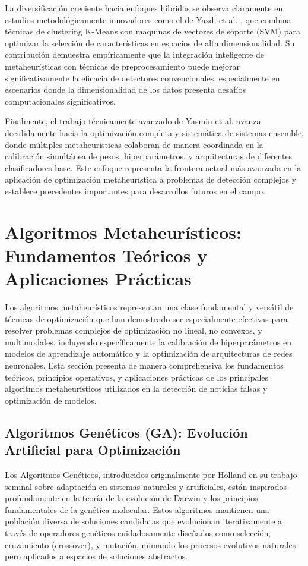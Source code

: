 La diversificación creciente hacia enfoques híbridos se observa claramente en estudios metodológicamente innovadores como el de Yazdi et al. \cite{yazdi2020improving}, que combina técnicas de clustering K-Means con máquinas de vectores de soporte (SVM) para optimizar la selección de características en espacios de alta dimensionalidad. Su contribución demuestra empíricamente que la integración inteligente de metaheurísticas con técnicas de preprocesamiento puede mejorar significativamente la eficacia de detectores convencionales, especialmente en escenarios donde la dimensionalidad de los datos presenta desafíos computacionales significativos.

Finalmente, el trabajo técnicamente avanzado de Yasmin et al. \cite{yasmin2024ensemble} avanza decididamente hacia la optimización completa y sistemática de sistemas ensemble, donde múltiples metaheurísticas colaboran de manera coordinada en la calibración simultánea de pesos, hiperparámetros, y arquitecturas de diferentes clasificadores base. Este enfoque representa la frontera actual más avanzada en la aplicación de optimización metaheurística a problemas de detección complejos y establece precedentes importantes para desarrollos futuros en el campo.

\section{Algoritmos Metaheurísticos: Fundamentos Teóricos y Aplicaciones Prácticas}
\label{sec:algoritmos_metaheuristicos}

Los algoritmos metaheurísticos representan una clase fundamental y versátil de técnicas de optimización que han demostrado ser especialmente efectivas para resolver problemas complejos de optimización no lineal, no convexos, y multimodales, incluyendo específicamente la calibración de hiperparámetros en modelos de aprendizaje automático y la optimización de arquitecturas de redes neuronales. Esta sección presenta de manera comprehensiva los fundamentos teóricos, principios operativos, y aplicaciones prácticas de los principales algoritmos metaheurísticos utilizados en la detección de noticias falsas y optimización de modelos.

\subsection{Algoritmos Genéticos (GA): Evolución Artificial para Optimización}

Los Algoritmos Genéticos, introducidos originalmente por Holland \cite{holland1992adaptation} en su trabajo seminal sobre adaptación en sistemas naturales y artificiales, están inspirados profundamente en la teoría de la evolución de Darwin y los principios fundamentales de la genética molecular. Estos algoritmos mantienen una población diversa de soluciones candidatas que evolucionan iterativamente a través de operadores genéticos cuidadosamente diseñados como selección, cruzamiento (crossover), y mutación, mimando los procesos evolutivos naturales pero aplicados a espacios de soluciones abstractos.

